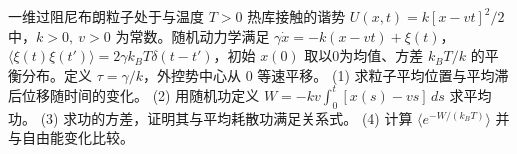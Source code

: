 一维过阻尼布朗粒子处于与温度 \(T>0\) 热库接触的谐势 \(U(x,t)=k[x-vt]^2/2\) 中，\(k>0,\ v>0\) 为常数。随机动力学满足 \(\gamma\dot x=-k(x-vt)+\xi(t)\)，\(\langle\xi(t)\xi(t')\rangle=2\gamma k_BT\delta(t-t')\)，初始 \(x(0)\) 取以0为均值、方差 \(k_BT/k\) 的平衡分布。定义 \(\tau=\gamma/k\)，外控势中心从 \(0\) 等速平移。
(1) 求粒子平均位置与平均滞后位移随时间的变化。
(2) 用随机功定义 \(W=-kv\int_0^t[x(s)-vs]\,ds\) 求平均功。
(3) 求功的方差，证明其与平均耗散功满足关系式。
(4) 计算 \(\langle e^{-W/(k_BT)}\rangle\) 并与自由能变化比较。
